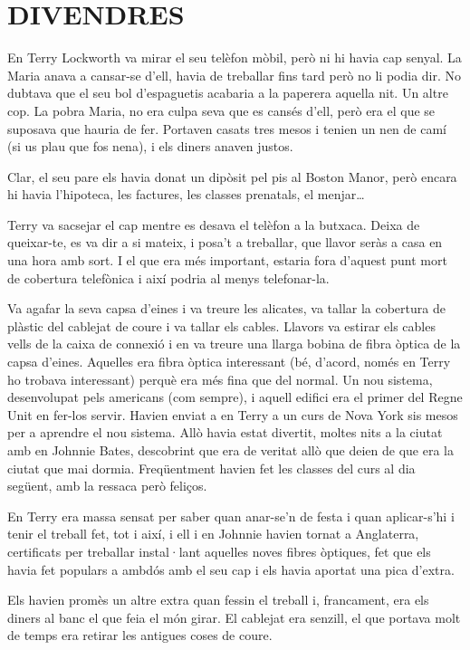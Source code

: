\chapter*{DIVENDRES}

En Terry Lockworth va mirar el seu telèfon mòbil, però ni hi havia cap
senyal. La Maria anava a cansar-se d'ell, havia de treballar fins tard
però no li podia dir. No dubtava que el seu bol d'espaguetis acabaria a
la paperera aquella nit. Un altre cop. La pobra Maria, no era culpa seva
que es cansés d'ell, però era el que se suposava que hauria de fer.
Portaven casats tres mesos i tenien un nen de camí (si us plau que fos
nena), i els diners anaven justos.

Clar, el seu pare els havia donat un dipòsit pel pis al Boston Manor,
però encara hi havia l'hipoteca, les factures, les classes prenatals, el
menjar\ldots{}

Terry va sacsejar el cap mentre es desava el telèfon a la butxaca. Deixa
de queixar-te, es va dir a si mateix, i posa't a treballar, que llavor
seràs a casa en una hora amb sort. I el que era més important, estaria
fora d'aquest punt mort de cobertura telefònica i així podria al menys
telefonar-la.

Va agafar la seva capsa d'eines i va treure les alicates, va tallar la
cobertura de plàstic del cablejat de coure i va tallar els cables.
Llavors va estirar els cables vells de la caixa de connexió i en va
treure una llarga bobina de fibra òptica de la capsa d'eines. Aquelles
era fibra òptica interessant (bé, d'acord, només en Terry ho trobava
interessant) perquè era més fina que del normal. Un nou sistema,
desenvolupat pels americans (com sempre), i aquell edifici era el primer
del Regne Unit en fer-los servir. Havien enviat a en Terry a un curs de
Nova York sis mesos per a aprendre el nou sistema. Allò havia estat
divertit, moltes nits a la ciutat amb en Johnnie Bates, descobrint que
era de veritat allò que deien de que era la ciutat que mai dormia.
Freqüentment havien fet les classes del curs al dia següent, amb la
ressaca però feliços.

En Terry era massa sensat per saber quan anar-se'n de festa i quan
aplicar-s'hi i tenir el treball fet, tot i així, i ell i en Johnnie
havien tornat a Anglaterra, certificats per treballar instal·lant
aquelles noves fibres òptiques, fet que els havia fet populars a ambdós
amb el seu cap i els havia aportat una pica d'extra.

Els havien promès un altre extra quan fessin el treball i, francament,
era els diners al banc el que feia el món girar. El cablejat era
senzill, el que portava molt de temps era retirar les antigues coses de
coure.

